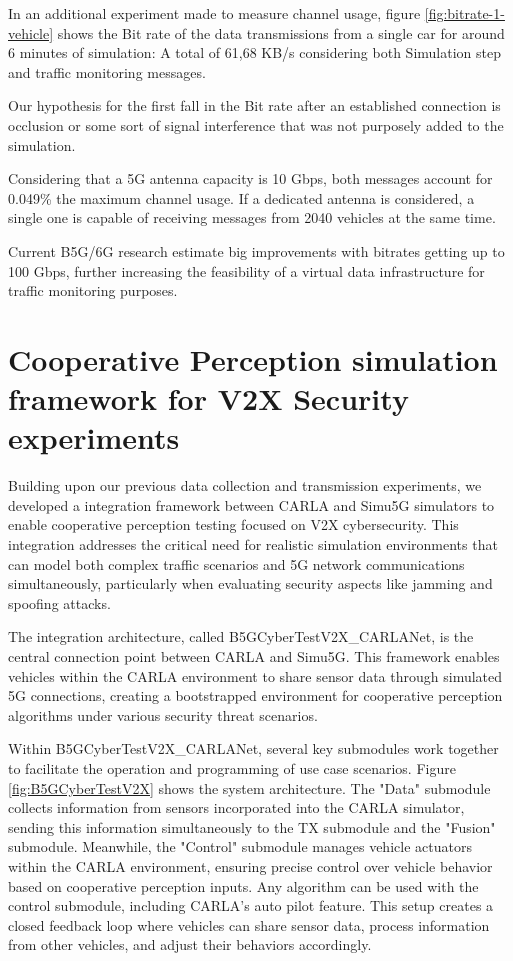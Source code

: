 In an additional experiment made to measure channel usage, figure \ref{fig:bitrate-1-vehicle} shows the Bit rate of the data transmissions from a single car for around 6 minutes of simulation: A total of 61,68 KB/s considering both Simulation step and traffic monitoring messages.

Our hypothesis for the first fall in the Bit rate after an established connection is occlusion or some sort of signal interference that was not purposely added to the simulation.

Considering that a 5G antenna capacity is 10 Gbps, both messages account for 0.049\% the maximum channel usage. If a dedicated antenna is considered, a single one is capable of receiving messages from 2040 vehicles at the same time.

Current B5G/6G research estimate big improvements with bitrates getting up to 100 Gbps, further increasing the feasibility of a virtual data infrastructure for traffic monitoring purposes.

\section{Cooperative Perception simulation framework for V2X Security experiments}

Building upon our previous data collection and transmission experiments, we developed a integration framework between CARLA and Simu5G simulators to enable cooperative perception testing focused on V2X cybersecurity. This integration addresses the critical need for realistic simulation environments that can model both complex traffic scenarios and 5G network communications simultaneously, particularly when evaluating security aspects like jamming and spoofing attacks.

The integration architecture, called B5GCyberTestV2X\_CARLANet, is the central connection point between CARLA and Simu5G. This framework enables vehicles within the CARLA environment to share sensor data through simulated 5G connections, creating a bootstrapped environment for cooperative perception algorithms under various security threat scenarios.

Within B5GCyberTestV2X\_CARLANet, several key submodules work together to facilitate the operation and programming of use case scenarios. Figure \ref{fig:B5GCyberTestV2X} shows the system architecture. The "Data" submodule collects information from sensors incorporated into the CARLA simulator, sending this information simultaneously to the TX submodule and the "Fusion" submodule. Meanwhile, the "Control" submodule manages vehicle actuators within the CARLA environment, ensuring precise control over vehicle behavior based on cooperative perception inputs. Any algorithm can be used with the control submodule, including CARLA's auto pilot feature. This setup creates a closed feedback loop where vehicles can share sensor data, process information from other vehicles, and adjust their behaviors accordingly.


